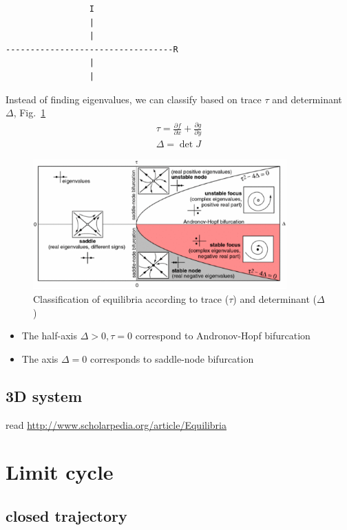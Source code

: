 \begin{verbatim}
                 I
                 |
                 |
----------------------------------R
                 |
                 |
\end{verbatim}
Instead of finding eigenvalues, we can classify based on trace $\tau$
and determinant $\Delta$, Fig.~\ref{fig:2D_system}
\begin{equation}
  \label{eq:648}
  \begin{split}
    \tau = \frac{\partial f}{\partial x} + \frac{\partial g}{\partial
      y} \\
    \Delta = \det J
  \end{split}
\end{equation}
\begin{figure}[hbt]
  \centerline{\includegraphics[height=5cm,
    angle=0]{./images/2D_system.eps}}
  \caption{Classification of equilibria according to trace ($\tau$)
    and determinant ($\Delta$)}
\label{fig:2D_system}
\end{figure}
\begin{itemize}
\item The half-axis  $\Delta > 0, \tau=0$ correspond to Andronov-Hopf
  bifurcation 
\item The axis $\Delta =0$ corresponds to saddle-node bifurcation
\end{itemize}

\subsection{3D system}
\label{sec:3d-system}

read \url{http://www.scholarpedia.org/article/Equilibria}




\section{Limit cycle}
\label{sec:limit-cycle}

\subsection{closed trajectory}
\label{sec:closed-trajectory}

